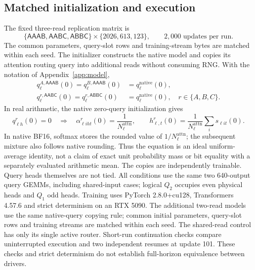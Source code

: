 \documentclass[11pt,letterpaper]{article}
\newcommand{\route}[1]{\textsf{#1}}
\begin{document}
\subsection{Matched initialization and execution}
The fixed three-read replication matrix is
\begin{equation}
 \{\route{AAAB},\route{AABC},\route{ABBC}\}
 \times\{2026,613,123\},
 \qquad 2{,}000\text{ updates per run}.
 \label{eq:fresh-matrix}
\end{equation}
The common parameters, query-slot rows and training-stream bytes are
matched within each seed. The initializer constructs the native model and
copies its attention routing query into additional reads without consuming
RNG. With the notation of Appendix~\ref{app:model},
\begin{equation}
 \begin{aligned}
 q_{\ell}^{A,\route{AAAB}}(0)=q_{\ell}^{B,\route{AAAB}}(0)
   &=q_\ell^{\mathrm{native}}(0),\\
 q_{\ell}^{r,\route{AABC}}(0)=q_{\ell}^{r,\route{ABBC}}(0)
   &=q_\ell^{\mathrm{native}}(0),\quad r\in\{A,B,C\}.
 \end{aligned}
 \label{eq:init-mapping}
\end{equation}
In real arithmetic, the native zero-query initialization gives
\begin{equation}
 q^r_{\ell h}(0)=0\quad\Longrightarrow\quad
 \alpha^r_{\ell iht}(0)=\frac{1}{N^{\mathrm{attn}}_\ell},\qquad
 h^r_{\ell,t}(0)=\frac{1}{N^{\mathrm{attn}}_\ell}
       \sum_i s_{\ell i t}(0).
 \label{eq:uniform-init}
\end{equation}
In native BF16, softmax stores the rounded value of $1/N^{\mathrm{attn}}_\ell$;
the subsequent mixture also follows native rounding. Thus the equation is
an ideal uniform-average identity, not a claim of exact unit probability
mass or bit equality with a separately evaluated arithmetic mean.
The copies are independently trainable. Query heads themselves are not
tied. All conditions use the same two 640-output query GEMMs, including
shared-input cases; logical $Q_2$ occupies even physical heads and $Q_1$ odd
heads. Training uses PyTorch 2.8.0+cu128, Transformers 4.57.6 and strict
determinism on an RTX 5090.
The additional two-read models use the same native-query copying rule;
common initial parameters, query-slot rows and training streams are matched
within each seed. The shared-read control has only its single active router.
Short-run continuation checks compare uninterrupted execution and two
independent resumes at update 101. These checks and strict determinism do
not establish full-horizon equivalence between drivers.
\end{document}
